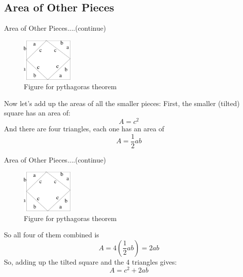 \documentclass[10pt]{beamer}
\begin{document}
\subsection{Area of Other Pieces}
\label{a_pieces}
\begin{frame}{Area of Other Pieces....(continue)}
\begin{figure}[htb!]
  \begin{center}
    \includegraphics[width=25mm,scale=0.5 ]{fig9.eps}
   \end{center}
  \caption{Figure for pythagoras theorem}
  \label{image1}
\end{figure}
\transfade

Now let's add up the areas of all the smaller pieces:\newline
First, the smaller (tilted) square has an area of:
\begin{equation}
\label{two}
A = c^2 
\end{equation} 
And there are four triangles, each one has an area of 
\begin{equation}
\label{three}
A =\frac{1}{2} ab
\end{equation}
\end{frame}

\begin{frame}{Area of Other Pieces....(continue)}
\begin{figure}[htb!]
  \begin{center}
    \includegraphics[width=25mm,scale=0.5 ]{fig9.eps}
   \end{center}
  \caption{Figure for pythagoras theorem}
  \label{image1}
\end{figure}

\transfade
So all four of them combined is	
\begin{equation}
\label{two}
A = 4(\frac{1}{2}ab) = 2ab
\end{equation} 
So, adding up the tilted square and the 4 triangles gives: 
\begin{equation}
\label{five}
A = c^2 +2ab
\end{equation}
\end{frame}
\end{document}
